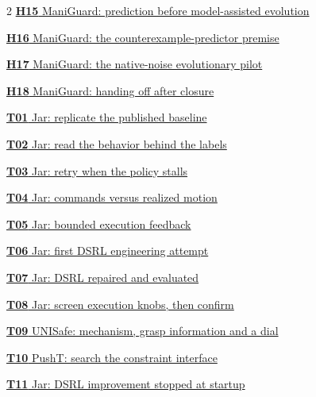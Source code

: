 \documentclass[11pt,a4paper]{article}
\begin{document}
\begin{multicols}{2}
\noindent\hyperref[exp:H15]{\textbf{H15} ManiGuard: prediction before model-assisted evolution}\par\vspace{5pt}
\noindent\hyperref[exp:H16]{\textbf{H16} ManiGuard: the counterexample-predictor premise}\par\vspace{5pt}
\noindent\hyperref[exp:H17]{\textbf{H17} ManiGuard: the native-noise evolutionary pilot}\par\vspace{5pt}
\noindent\hyperref[exp:H18]{\textbf{H18} ManiGuard: handing off after closure}\par\vspace{5pt}
\noindent\hyperref[exp:T01]{\textbf{T01} Jar: replicate the published baseline}\par\vspace{5pt}
\noindent\hyperref[exp:T02]{\textbf{T02} Jar: read the behavior behind the labels}\par\vspace{5pt}
\noindent\hyperref[exp:T03]{\textbf{T03} Jar: retry when the policy stalls}\par\vspace{5pt}
\noindent\hyperref[exp:T04]{\textbf{T04} Jar: commands versus realized motion}\par\vspace{5pt}
\noindent\hyperref[exp:T05]{\textbf{T05} Jar: bounded execution feedback}\par\vspace{5pt}
\noindent\hyperref[exp:T06]{\textbf{T06} Jar: first DSRL engineering attempt}\par\vspace{5pt}
\noindent\hyperref[exp:T07]{\textbf{T07} Jar: DSRL repaired and evaluated}\par\vspace{5pt}
\noindent\hyperref[exp:T08]{\textbf{T08} Jar: screen execution knobs, then confirm}\par\vspace{5pt}
\noindent\hyperref[exp:T09]{\textbf{T09} UNISafe: mechanism, grasp information and a dial}\par\vspace{5pt}
\noindent\hyperref[exp:T10]{\textbf{T10} PushT: search the constraint interface}\par\vspace{5pt}
\noindent\hyperref[exp:T11]{\textbf{T11} Jar: DSRL improvement stopped at startup}\par\vspace{5pt}

\end{multicols}
\end{document}
